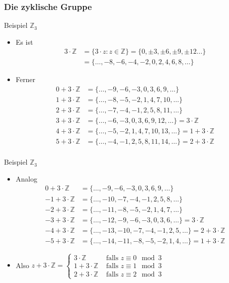 \documentclass{beamer}
\newcommand\ZZ{\mathbb Z}
\begin{document}
\begin{frame}\frametitle{Die zyklische Gruppe}
	\begin{overprint}
		\begin{block}{Beispiel $\ZZ_3$}
			\begin{itemize}
				\item Es ist
					\begin{align*}
						3\cdot\ZZ&=\{3\cdot z:z\in\ZZ\}=\{0,\pm3,\pm6,\pm9,\pm12\ldots\}\\
								 &=\{\ldots,-8,-6,-4,-2,0,2,4,6,8,\ldots\}
					\end{align*}
				\item Ferner
					\begin{align*}
						0+3\cdot\ZZ&=\{\ldots,-9,-6,-3,0,3,6,9,\ldots\}\\
						1+3\cdot\ZZ&=\{\ldots,-8,-5,-2,1,4,7,10,\ldots\}\\
						2+3\cdot\ZZ&=\{\ldots,-7,-4,-1,2,5,8,11,\ldots\}\\
						3+3\cdot\ZZ&=\{\ldots,-6,-3,0,3,6,9,12,\ldots\}=3\cdot\ZZ\\
						4+3\cdot\ZZ&=\{\ldots,-5,-2,1,4,7,10,13,\ldots\}=1+3\cdot\ZZ\\
						5+3\cdot\ZZ&=\{\ldots,-4,-1,2,5,8,11,14,\ldots\}=2+3\cdot\ZZ\\
					\end{align*}
			\end{itemize}
		\end{block}
		\begin{block}{Beispiel $\ZZ_3$}
			\begin{itemize}
				\item Analog
					\begin{align*}
						0+3\cdot\ZZ&=\{\ldots,-9,-6,-3,0,3,6,9,\ldots\}\\
						-1+3\cdot\ZZ&=\{\ldots,-10,-7,-4,-1,2,5,8,\ldots\}\\
						-2+3\cdot\ZZ&=\{\ldots,-11,-8,-5,-2,1,4,7,\ldots\}\\
						-3+3\cdot\ZZ&=\{\ldots,-12,-9,-6,-3,0,3,6,\ldots\}=3\cdot\ZZ\\
						-4+3\cdot\ZZ&=\{\ldots,-13,-10,-7,-4,-1,2,5,\ldots\}=2+3\cdot\ZZ\\
						-5+3\cdot\ZZ&=\{\ldots,-14,-11,-8,-5,-2,1,4,\ldots\}=1+3\cdot\ZZ
					\end{align*}
				\item Also $\displaystyle z+3\cdot\ZZ=\begin{cases} 3\cdot\ZZ&\mbox{ falls $z\equiv0\mod3$}\\ 1+3\cdot\ZZ&\mbox{ falls $z\equiv1\mod3$}\\2+3\cdot\ZZ&\mbox{ falls $z\equiv2\mod3$} \end{cases} $

\end{itemize}
\end{block}
\end{overprint}
\end{frame}
\end{document}
